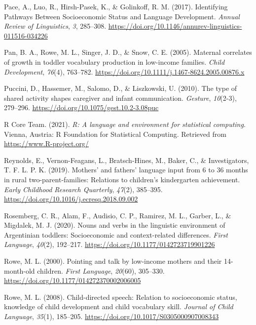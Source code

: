 \documentclass[
  man,floatsintext]{apa6}
\newlength{\cslhangindent}
\newlength{\cslentryspacingunit} %
\newenvironment{CSLReferences}[2] %
 {%
  \setlength{\parindent}{0pt}
  \ifodd #1
  \let\oldpar\par
  \def\par{\hangindent=\cslhangindent\oldpar}
  \fi
  \setlength{\parskip}{#2\cslentryspacingunit}
 }%
 {}
\begin{document}
\begin{CSLReferences}{1}{0}
\leavevmode{}%
Pace, A., Luo, R., Hirsh-Pasek, K., \& Golinkoff, R. M. (2017). Identifying {Pathways} {Between} {Socioeconomic} {Status} and {Language} {Development}. \emph{Annual Review of Linguistics}, \emph{3}, 285--308. \url{https://doi.org/10.1146/annurev-linguistics-011516-034226}

\leavevmode{}%
Pan, B. A., Rowe, M. L., Singer, J. D., \& Snow, C. E. (2005). Maternal correlates of growth in toddler vocabulary production in low-income families. \emph{Child Development}, \emph{76}(4), 763--782. \url{https://doi.org/10.1111/j.1467-8624.2005.00876.x}

\leavevmode{}%
Puccini, D., Hassemer, M., Salomo, D., \& Liszkowski, U. (2010). The type of shared activity shapes caregiver and infant communication. \emph{Gesture}, \emph{10}(2-3), 279--296. \url{https://doi.org/10.1075/gest.10.2-3.08puc}

\leavevmode{}%
R Core Team. (2021). \emph{R: A language and environment for statistical computing}. Vienna, Austria: R Foundation for Statistical Computing. Retrieved from \url{https://www.R-project.org/}

\leavevmode{}%
Reynolds, E., Vernon-Feagans, L., Bratsch-Hines, M., Baker, C., \& Investigators, T. F. L. P. K. (2019). Mothers' and fathers' language input from 6 to 36 months in rural two-parent-families: {Relations} to children's kindergarten achievement. \emph{Early Childhood Research Quarterly}, \emph{47}(2), 385--395. \url{https://doi.org/10.1016/j.ecresq.2018.09.002}

\leavevmode{}%
Rosemberg, C. R., Alam, F., Audisio, C. P., Ramirez, M. L., Garber, L., \& Migdalek, M. J. (2020). Nouns and verbs in the linguistic environment of {Argentinian} toddlers: {Socioeconomic} and context-related differences. \emph{First Language}, \emph{40}(2), 192--217. \url{https://doi.org/10.1177/0142723719901226}

\leavevmode{}%
Rowe, M. L. (2000). Pointing and talk by low-income mothers and their 14-month-old children. \emph{First Language}, \emph{20}(60), 305--330. \url{https://doi.org/10.1177/014272370002006005}

\leavevmode{}%
Rowe, M. L. (2008). Child-directed speech: Relation to socioeconomic status, knowledge of child development and child vocabulary skill. \emph{Journal of Child Language}, \emph{35}(1), 185--205. \url{https://doi.org/10.1017/S0305000907008343}


\end{CSLReferences}
\end{document}
